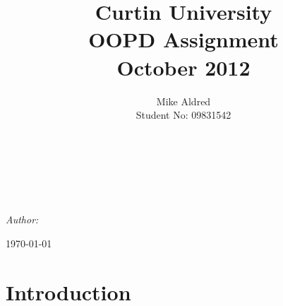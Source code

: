 \documentclass[a4paper]{book}
\title{ Curtin University \\ OOPD Assignment \\ October 2012 }
\author{ Mike Aldred \\ Student No: 09831542 }
\begin{document}
\makeatletter
\renewcommand{\maketitle}{
  \begin{titlepage}
    \begin{center}
      \HRule \\[0.4cm]
             { \huge \bfseries \@title}\\[0.4cm]
             \HRule \\[1.5cm]

             \begin{minipage}{0.4\textwidth}
               \begin{flushleft} \large
                 \emph{Author:}\\
                 \@author
               \end{flushleft}
             \end{minipage}

             \vfill

             {\large \today}
    \end{center}
  \end{titlepage}
}
\makeatother

\pagestyle{empty}

\maketitle
\frontmatter
\tableofcontents
\mainmatter
{}
\pagestyle{fancy}

\chapter{Introduction}
\end{document}
